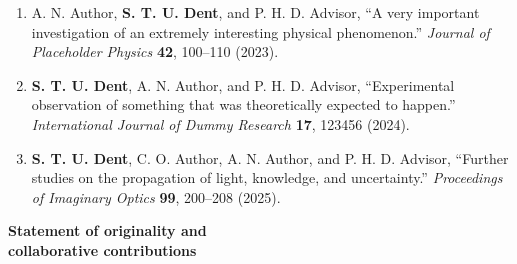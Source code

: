 \renewcommand{\listtablename}{List of Publications}
\listoftables
\begin{enumerate}
    \item A. N. Author, \textbf{S. T. U. Dent}, and P. H. D. Advisor, 
    ``A very important investigation of an extremely interesting physical phenomenon.'' 
    \textit{Journal of Placeholder Physics} \textbf{42}, 100--110 (2023).

    \item \textbf{S. T. U. Dent}, A. N. Author, and P. H. D. Advisor, 
    ``Experimental observation of something that was theoretically expected to happen.'' 
    \textit{International Journal of Dummy Research} \textbf{17}, 123456 (2024).

    \item \textbf{S. T. U. Dent}, C. O. Author, A. N. Author, and P. H. D. Advisor, 
    ``Further studies on the propagation of light, knowledge, and uncertainty.'' 
    \textit{Proceedings of Imaginary Optics} \textbf{99}, 200--208 (2025).
\end{enumerate}

\cleardoublepage

\begin{Huge}

\noindent \textbf{Statement of originality and \\[1ex]collaborative contributions} \end{Huge}
\vspace{0.7cm}



\cleardoublepage

\listoffigures
\cleardoublepage
{}		%


  \tableofcontents
\cleardoublepage
{}    %



\cleardoublepage
{}		%


